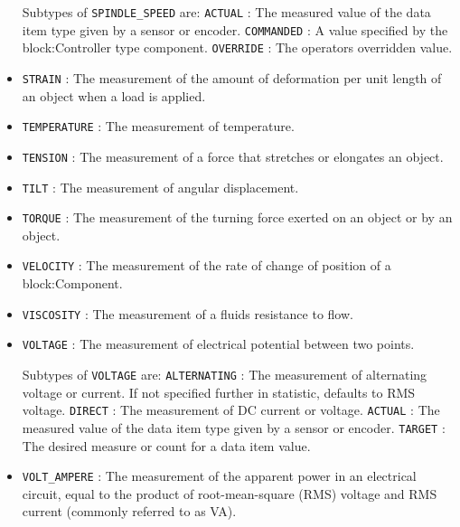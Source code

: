\begin{itemize}
Subtypes of \texttt{SPINDLE_SPEED} are: 
\newline\tab \texttt{ACTUAL} : The measured value of the data item type given by a sensor or encoder. 
\newline\tab \texttt{COMMANDED} : A value specified by the {block:Controller} type component. 
\newline\tab \texttt{OVERRIDE} : The operators overridden value. 
\item \texttt{STRAIN} : The measurement of the amount of deformation per unit length of an object when a load is applied. 

\item \texttt{TEMPERATURE} : The measurement of temperature. 

\item \texttt{TENSION} : The measurement of a force that stretches or elongates an object. 

\item \texttt{TILT} : The measurement of angular displacement. 

\item \texttt{TORQUE} : The measurement of the turning force exerted on an object or by an object. 

\item \texttt{VELOCITY} : The measurement of the rate of change of position of a {block:Component}. 

\item \texttt{VISCOSITY} : The measurement of a fluids resistance to flow. 

\item \texttt{VOLTAGE} : The measurement of electrical potential between two points. 

Subtypes of \texttt{VOLTAGE} are: 
\newline\tab \texttt{ALTERNATING} : The measurement of alternating voltage or current.   If not specified further in statistic, defaults to RMS voltage.  
\newline\tab \texttt{DIRECT} : The measurement of DC current or voltage. 
\newline\tab \texttt{ACTUAL} : The measured value of the data item type given by a sensor or encoder. 
\newline\tab \texttt{TARGET} : The desired measure or count for a data item value. 
\item \texttt{VOLT_AMPERE} : The measurement of the apparent power in an electrical circuit, equal to the product of root-mean-square (RMS) voltage and RMS current (commonly referred to as VA). 


\end{itemize}
